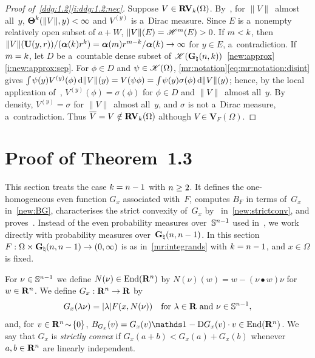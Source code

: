 \documentclass[a4paper,twoside,leqno]{article}
\newcommand{\Gk}{\pgrass{\adim}{\vdim}}        %
\newcommand{\Gh}{\pgrass{\adim}{\adim-1}}      %
\begin{document}
\begin{proof}[Proof of~\ref{ddg:1.2}\ref{i:ddg:1.2:nec}]
    Suppose $V \in \mathbf{RV}_{k}(\Omega)$. By~\cite[3.5(1)(a)]{Allard1972}, for $\|V\|$~almost
    all~$y$, $\boldsymbol{\Theta}^{k}(\|V\|,y) < \infty$ and $V^{(y)}$ is a~Dirac measure. Since $E$ is
    a~nonempty relatively open subset of $a + W$, $\|V\|(E) = \mathscr{H}^m(E) > 0$. If $m < k$, then
    $\|V\|(\mathbf{U}(y,r)) / (\boldsymbol{\alpha}(k) r^{k}) = \boldsymbol{\alpha}(m) r^{m - k} /
    \boldsymbol{\alpha}(k) \to \infty$ for $y \in E$, a~contradiction. If $m = k$, let $D$ be
    a~countable dense subset of $\ccspace{\Gk}$~\ref{new:approx}\ref{i:new:approx:sep}. For
    $\phi \in D$ and $\psi \in \mathscr{K}(\Omega)$,
    \ref{mr:notation}\eqref{eq:mr:notation:disint} gives ${\textstyle\int_{}^{}} \psi(y) V^{(y)}(\phi) \,\mathrm{d}
    \|V\|(y) = V(\psi \phi) = {\textstyle\int_{}^{}} \psi(y) \sigma(\phi) \,\mathrm{d} \|V\|(y)$; hence, by the local
    application of~\cite[2.8.18, 2.9.8]{Federer1969}, $V^{(y)}(\phi) = \sigma(\phi)$ for $\phi \in
    D$ and $\|V\|$~almost all~$y$. By density, $V^{(y)} = \sigma$ for $\|V\|$~almost all~$y$, and
    $\sigma$ is not a~Dirac measure, a~contradiction. Thus $\overline V = V \notin
    \mathbf{RV}_{k}(\Omega)$ although $V \in \mathbf{V}_F(\Omega)$.
\end{proof}

\section{Proof of Theorem~1.3}
\label{sec:proof13}

\begin{miniremark}
    \label{mr:proof13}
    This section treats the case $k = n - 1$ with $n \ge 2$. It defines the
    one-homogeneous even function $G_x$ associated with~$F$, computes $B_F$ in terms of~$G_x$
    in~\ref{new:BG}, characterises the strict convexity of~$G_x$ by~\cite[(5.3)]{DePhilippis2018}
    in~\ref{new:strictconv}, and proves~\cite[Theorem~1.3]{DePhilippis2018}. Instead of the even
    probability measures over~$\mathbb{S}^{n-1}$ used in~\cite[section~5]{DePhilippis2018}, we
    work directly with probability measures over~$\Gh$. In this section $F : \Omega \times \Gh \to
    (0,\infty)$ is as in~\ref{mr:integrands} with $k = n - 1$, and $x \in \Omega$ is fixed.
\end{miniremark}

\begin{definition}
    \label{new:Gx}
    For $\nu \in \mathbb{S}^{n-1}$ we define $N(\nu) \in \mathrm{End}({\mathbf{R}^{n}})$ by $N(\nu)(w) = w - (\nu
    \bullet w) \nu$ for $w \in \mathbf{R}^{n}$. We define $G_x : \mathbf{R}^{n} \to \mathbf{R}$ by
    \begin{displaymath}
        G_x(\lambda \nu) = |\lambda| F(x, N(\nu)) \quad \text{for $\lambda \in \mathbf{R}$ and $\nu \in
        \mathbb{S}^{n-1}$},
    \end{displaymath}
    and, for $v \in \mathbf{R}^{n} \!\sim\! \{0\}$, $B_{G_x}(v) = G_x(v) \id{} - \uD G_x(v) \cdot v \in
    \End{\R^{\adim}}$. We say that $G_x$ is \emph{strictly convex} if $G_x(a + b) < G_x(a) + G_x(b)$
    whenever $a, b \in \mathbf{R}^{n}$ are linearly independent.
\end{definition}
\end{document}
